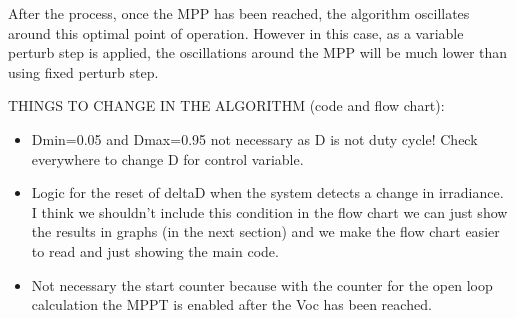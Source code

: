 After the process, once the MPP has been reached, the algorithm oscillates around this optimal point of operation. However in this case, as a variable perturb step is applied, the oscillations around the MPP will be much lower than using fixed perturb step.  

\vspace{2cm}
THINGS TO CHANGE IN THE ALGORITHM (code and flow chart):
\begin{itemize}
	\item Dmin=0.05 and Dmax=0.95 not necessary as D is not duty cycle! Check everywhere to change D for control variable. 
	\item Logic for the reset of deltaD when the system detects a change in irradiance. I think we shouldn't include this condition in the flow chart we can just show the results in graphs (in the next section) and we make the flow chart easier to read and just showing the main code. 
	\item Not necessary the start counter because with the counter for the open loop calculation the MPPT is enabled after the Voc has been reached. 
\end{itemize}



